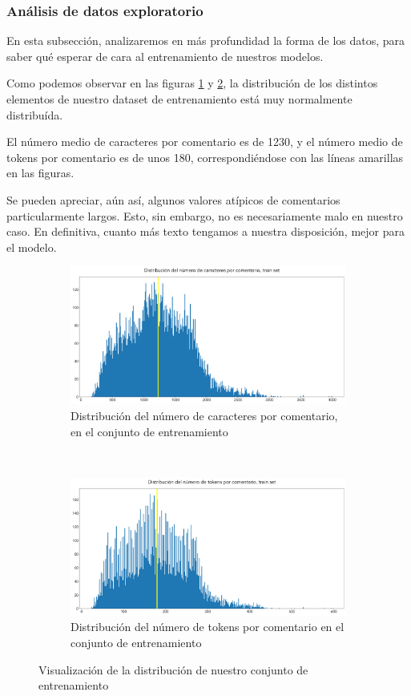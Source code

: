 \subsubsection{Análisis de datos exploratorio}
En esta subsección, analizaremos en más profundidad la forma de los datos, para saber qué esperar de cara al entrenamiento de nuestros modelos.

Como podemos observar en las figuras \ref{fig:avg_char_train} y \ref{fig:avg_tokens_train}, la distribución de los distintos elementos de nuestro dataset de entrenamiento está muy normalmente distribuída.

El número medio de caracteres por comentario es de 1230, y el número medio de tokens por comentario es de unos 180, correspondiéndose con las líneas amarillas en las figuras.

Se pueden apreciar, aún así, algunos valores atípicos de comentarios particularmente largos. Esto, sin embargo, no es necesariamente malo en nuestro caso. En definitiva, cuanto más texto tengamos a nuestra disposición, mejor para el modelo.

\begin{figure}[h!]
	\centering
	\begin{subfigure}[t]{0.95\textwidth}
		\centering
		\includegraphics[width=.9\textwidth]{media/char_hist_train.pdf}
		\caption{Distribución del número de caracteres por comentario, en el conjunto de entrenamiento}
		\label{fig:avg_char_train}
	\end{subfigure}
	~

	\begin{subfigure}[t]{0.95\textwidth}
		\centering
		\includegraphics[width=.9\textwidth]{media/tokens_hist_train.pdf}
		\caption{Distribución del número de tokens por comentario en el conjunto de entrenamiento}
		\label{fig:avg_tokens_train}
	\end{subfigure}

	\caption{Visualización de la distribución de nuestro conjunto de entrenamiento}
	\label{fig:sum_train}
\end{figure}


